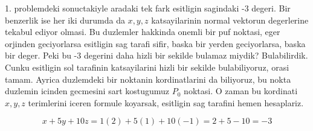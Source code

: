 \documentclass[12pt,fleqn]{article}
\begin{document}
1. problemdeki sonuctakiyle aradaki tek fark esitligin sagindaki -3
degeri. Bir benzerlik ise her iki durumda da $x,y,z$ katsayilarinin normal
vektorun degerlerine tekabul ediyor olmasi. Bu duzlemler hakkinda onemli
bir puf noktasi, eger orjinden geciyorlarsa esitligin sag tarafi sifir,
baska bir yerden geciyorlarsa, baska bir deger. Peki bu -3 degerini daha
hizli bir sekilde bulamaz miydik? Bulabilirdik. Cunku esitligin sol
tarafinin katsayilarini hizli bir sekilde bulabiliyoruz, orasi
tamam. Ayrica duzlemdeki bir noktanin kordinatlarini da biliyoruz, bu nokta
duzlemin icinden gecmesini sart kostugumuz $P_0$ noktasi. O zaman bu
kordinati $x,y,z$ terimlerini iceren formule koyarsak, esitligin sag
tarafini hemen hesaplariz. 

\[ x+5y + 10z = 1(2) + 5(1) + 10(-1) = 2 + 5 -10 = -3\]
\end{document}
